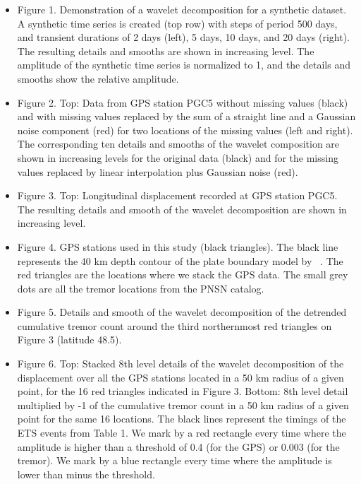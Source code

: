 \documentclass{article}
\begin{document}
\begin{itemize}

\item Figure 1. Demonstration of a wavelet decomposition for a synthetic dataset. A synthetic time series is created (top row) with steps of period 500 days, and transient durations of 2 days (left), 5 days, 10 days, and 20 days (right). The resulting details and smooths are shown in increasing level. The amplitude of the synthetic time series is normalized to 1, and the details and smooths show the relative amplitude.

\item Figure 2. Top: Data from GPS station PGC5 without missing values (black) and with missing values replaced by the sum of a straight line and a Gaussian noise component (red) for two locations of the missing values (left and right). The corresponding ten details and smooths of the wavelet composition are shown in increasing levels for the original data (black) and for the missing values replaced by linear interpolation plus Gaussian noise (red).

\item Figure 3. Top: Longitudinal displacement recorded at GPS station PGC5. The resulting details and smooth of the wavelet decomposition are shown in increasing level.

\item Figure 4. GPS stations used in this study (black triangles). The black line represents the 40 km depth contour of the plate boundary model by ~\citet{PRE_2003}. The red triangles are the locations where we stack the GPS data. The small grey dots are all the tremor locations from the PNSN catalog.

\item Figure 5. Details and smooth of the wavelet decomposition of the detrended cumulative tremor count around the third northernmost red triangles on Figure 3 (latitude 48.5).

\item Figure 6. Top: Stacked 8th level details of the wavelet decomposition of the displacement over all the GPS stations located in a 50 km radius of a given point, for the 16 red triangles indicated in Figure 3. Bottom: 8th level detail multiplied by -1 of the cumulative tremor count in a 50 km radius of a given point for the same 16 locations. The black lines represent the timings of the ETS events from Table 1. We mark by a red rectangle every time where the amplitude is higher than a threshold of 0.4 (for the GPS) or 0.003 (for the tremor). We mark by a blue rectangle every time where the amplitude is lower than minus the threshold.


\end{itemize}
\end{document}
